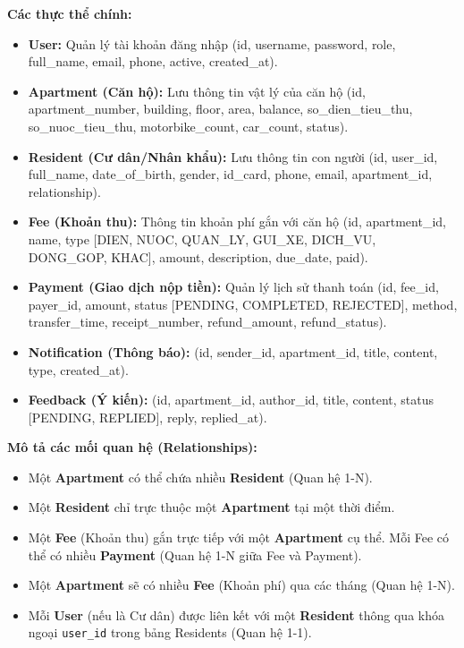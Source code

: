 \documentclass[12pt,a4paper]{article}
\begin{document}
\textbf{Các thực thể chính:}
\begin{itemize}
    \item \textbf{User:} Quản lý tài khoản đăng nhập (id, username, password, role, full\_name, email, phone, active, created\_at).
    \item \textbf{Apartment (Căn hộ):} Lưu thông tin vật lý của căn hộ (id, apartment\_number, building, floor, area, balance, so\_dien\_tieu\_thu, so\_nuoc\_tieu\_thu, motorbike\_count, car\_count, status).
    \item \textbf{Resident (Cư dân/Nhân khẩu):} Lưu thông tin con người (id, user\_id, full\_name, date\_of\_birth, gender, id\_card, phone, email, apartment\_id, relationship).
    \item \textbf{Fee (Khoản thu):} Thông tin khoản phí gắn với căn hộ (id, apartment\_id, name, type [DIEN, NUOC, QUAN\_LY, GUI\_XE, DICH\_VU, DONG\_GOP, KHAC], amount, description, due\_date, paid).
    \item \textbf{Payment (Giao dịch nộp tiền):} Quản lý lịch sử thanh toán (id, fee\_id, payer\_id, amount, status [PENDING, COMPLETED, REJECTED], method, transfer\_time, receipt\_number, refund\_amount, refund\_status).
    \item \textbf{Notification (Thông báo):} (id, sender\_id, apartment\_id, title, content, type, created\_at).
    \item \textbf{Feedback (Ý kiến):} (id, apartment\_id, author\_id, title, content, status [PENDING, REPLIED], reply, replied\_at).
\end{itemize}

\textbf{Mô tả các mối quan hệ (Relationships):}
\begin{itemize}
    \item Một \textbf{Apartment} có thể chứa nhiều \textbf{Resident} (Quan hệ 1-N).
    \item Một \textbf{Resident} chỉ trực thuộc một \textbf{Apartment} tại một thời điểm.
    \item Một \textbf{Fee} (Khoản thu) gắn trực tiếp với một \textbf{Apartment} cụ thể. Mỗi Fee có thể có nhiều \textbf{Payment} (Quan hệ 1-N giữa Fee và Payment).
    \item Một \textbf{Apartment} sẽ có nhiều \textbf{Fee} (Khoản phí) qua các tháng (Quan hệ 1-N).
    \item Mỗi \textbf{User} (nếu là Cư dân) được liên kết với một \textbf{Resident} thông qua khóa ngoại \texttt{user\_id} trong bảng Residents (Quan hệ 1-1).
\end{itemize}
\end{document}
